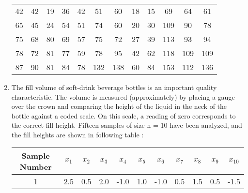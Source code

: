 \documentclass[11pt, a4paper]{article}
\begin{document}
\begin{enumerate}
	\begin{table}[h]
	\def\arraystretch{1.5}
	
	\begin{center}
	\begin{tabular}{|cccccccccccc|}
	
	\hline
	
	42 & 42 & 19 & 36 & 42 & 51 & 60 & 18 & 15 & 69 & 64 & 61 \\
	
	65 & 45 & 24 & 54 & 51 & 74 & 60 & 20 & 30 & 109 & 90 & 78 \\
	
	75 & 68 & 80 & 69 & 57 & 75 & 72 & 27 & 39 & 113 & 93 & 94 \\
	
	78 & 72 & 81 & 77 & 59 & 78 & 95 & 42 & 62 & 118 & 109 & 109 \\
	
	87 & 90 & 81 & 84 & 78 & 132 & 138 & 60 & 84 & 153 & 112 & 136 \\
	
	\hline
	
	\end{tabular}
	\end{center}
	
	\end{table}
	
	
	
	
	
	
	\item The fill volume of soft-drink beverage bottles is an important quality characteristic. The volume is measured (approximately) by placing a gauge over the crown and comparing the height of the liquid in the neck of the bottle against a coded scale. On this scale, a reading of zero corresponds to the correct fill height. Fifteen samples of size n = 10 have been analyzed, and the fill heights are shown in following table :
	
	\begin{table}[h]
	\def\arraystretch{1.5}
	
	\begin{center}
	\begin{tabular}{|c||cccccccccc|}
	
	\hline
	
	Sample Number & $x_1$ & $x_2$ & $x_3$ & $x_4$ & $x_5$ & $x_6$ & $x_7$ & $x_8$ & $x_9$ & $x_{10}$ \\
	
	\hline
	
	1 & 2.5 & 0.5 & 2.0 & -1.0 & 1.0 & -1.0 & 0.5 & 1.5 & 0.5 & -1.5 \\
	

\end{tabular}
\end{center}
\end{table}
\end{enumerate}
\end{document}

